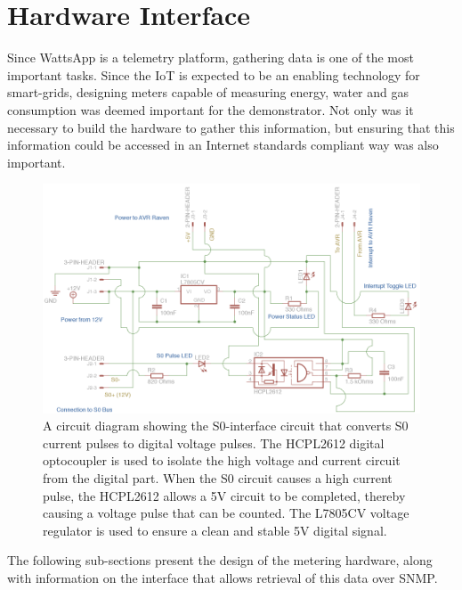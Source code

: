 \documentclass[10pt, conference, compsocconf]{IEEEtran}
\begin{document}
\section{Hardware Interface}

Since WattsApp is a telemetry platform, gathering data is one of the
most important tasks. Since the IoT is expected to be an enabling
technology for smart-grids, designing meters capable of measuring
energy, water and gas consumption was deemed important for the demonstrator.
Not only was it necessary to build the hardware to gather this information,
but ensuring that this information could be accessed in an Internet
standards compliant way was also important.

\begin{figure}[t]
\begin{centering}
\includegraphics[scale=.75]{images/schematic} 
\par\end{centering}

\caption{A circuit diagram showing the S0-interface circuit that converts S0
current pulses to digital voltage pulses. The HCPL2612 digital optocoupler
is used to isolate the high voltage and current circuit from the digital
part. When the S0 circuit causes a high current pulse, the HCPL2612
allows a 5V circuit to be completed, thereby causing a voltage pulse
that can be counted. The L7805CV voltage regulator is used to ensure
a clean and stable 5V digital signal.}


\label{fig:S0-interface} 
\end{figure}


The following sub-sections present the design of the metering hardware,
along with information on the interface that allows retrieval of this
data over SNMP.
\end{document}

